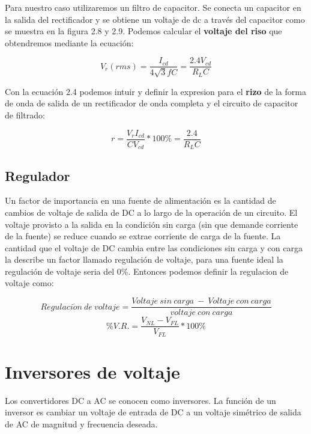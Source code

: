 Para nuestro caso utilizaremos un filtro de capacitor. Se conecta un capacitor en la salida del rectificador y se obtiene un voltaje de dc a través del capacitor como se muestra en la figura 2.8 y 2.9. Podemos calcular el \textbf{voltaje del riso} que obtendremos mediante la ecuación:

\begin{equation}
V_{r}(rms)=\dfrac{I_{cd}}{4\sqrt{3}fC}=\dfrac{2.4V_{cd}}{R_{L}C}
\end{equation}

Con la ecuación 2.4 podemos intuir y definir la expresion para el \textbf{rizo} de la forma de onda de salida de un rectificador de onda completa y el circuito de capacitor de filtrado:

\begin{equation}
r=\dfrac{V_{r}I_{cd}}{CV_{cd}}*100\%=\dfrac{2.4}{R_{L}C}
\end{equation}

\subsection{Regulador}

Un factor de importancia en una fuente de alimentación es la cantidad de cambios de voltaje de salida de DC a lo largo de la operación de un circuito. El voltaje provisto a la salida en la condición sin carga (sin que demande corriente de la fuente) se reduce cuando se extrae corriente de carga de la fuente. La cantidad que el voltaje de DC cambia entre las condiciones sin carga y con carga la describe un factor llamado regulación de voltaje, para una fuente ideal la regulación de voltaje seria del 0\%. Entonces podemos definir la regulacion de voltaje como:
 

$$Regulaci\acute{o}n\:de\: voltaje = \dfrac{Voltaje\: sin \:carga \:-\: Voltaje\: con\: carga}{voltaje\: con\: carga}$$
\begin{equation} 
 \%V.R. = \dfrac{V_{NL}-V_{FL}}{V_{FL}}*100\%
\end{equation}





\newpage

\section{Inversores de voltaje}

Los convertidores DC a AC se conocen como inversores. La función de un inversor es cambiar un voltaje de entrada de DC a un voltaje simétrico de salida de AC de magnitud y frecuencia deseada. \\

